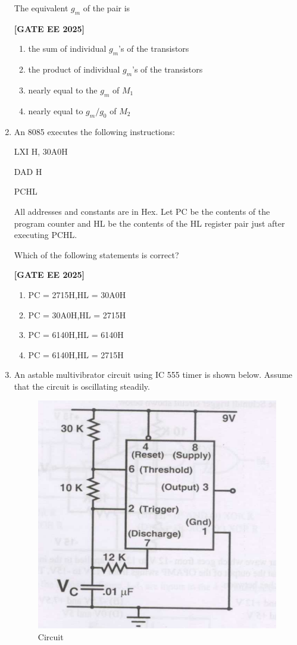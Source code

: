 \documentclass[12pt]{article}
\begin{document}
\begin{enumerate}[leftmargin=*, label=\textbf{Q.\arabic*:}]
The equivalent $g_m$ of the pair is
 
\noindent \textbf{[GATE EE 2025]}
\begin{enumerate}
  \item the sum of individual $g_m$'s of the transistors
  \item the product of individual $g_m$'s of the transistors
  \item nearly equal to the $g_m$ of $M_1$
  \item nearly equal to $g_m/g_{0}$ of $M_2$
\end{enumerate}

\item An 8085 executes the following instructions:

LXI H, 30A0H

DAD H

PCHL

All addresses and constants are in Hex. Let PC be the contents of the program counter and HL be the contents of the HL register pair just after executing PCHL.

Which of the following statements is correct?
 
\noindent \textbf{[GATE EE 2025]}
\begin{multicols}{2}
\begin{enumerate}
  \item PC = 2715H,\quad HL = 30A0H
  \item PC = 30A0H,\quad HL = 2715H
  \item PC = 6140H,\quad HL = 6140H
  \item PC = 6140H,\quad HL = 2715H
\end{enumerate}
\end{multicols}

\item An astable multivibrator circuit using IC 555 timer is shown below. Assume that the circuit is oscillating steadily.

\begin{figure}[H]\centering
\includegraphics[width=0.7\columnwidth]{figs/q50.png}
\caption{Circuit}
\label{fig:q50}
\end{figure}


\end{enumerate}
\end{document}

